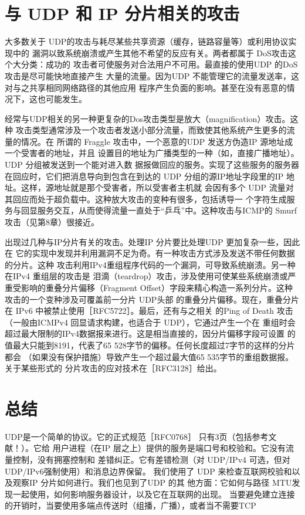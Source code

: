 \section{与 UDP 和 IP 分片相关的攻击}
大多数关于 UDP的攻击与耗尽某些共享资源（缓存，链路容量等）或利用协议实现中的
漏洞以致系统崩溃或产生其他不希望的反应有关。两者都属于 DoS攻击这个大分类：成功的
攻击者可使服务对合法用户不可用。最直接的使用UDP 的DoS攻击是尽可能快地直接产生
大量的流量。因为UDP 不能管理它的流量发送率，这对与之共享相同网络路径的其他应用
程序产生负面的影响。甚至在没有恶意的情况下，这也可能发生。

经常与UDP相关的另一种更复杂的Dos攻击类型是放大（magnification）攻击。这种
攻击类型通常涉及一个攻击者发送小部分流量，而致使其他系统产生更多的流量的情况。在
所谓的 Fraggle 攻击中，一个恶意的UDP 发送方伪造IP 源地址成一个受害者的地址，并且
设置目的地址为广播类型的一种（如，直接广播地址）。UDP 分组被发送到一个能对进入数
据报做回应的服务。实现了这些服务的服务器在回应时，它们把消息导向到包含在到达的
UDP 分组的源IP地址字段里的IP 地址。这样，源地址就是那个受害者，所以受害者主机就
会因有多个 UDP 流量对其回应而处于超负载中。这种放大攻击的变种有很多，包括诱导一
个字符生成服务与回显服务交互，从而使得流量一直处于“乒乓”中。这种攻击与ICMP的
Smurf 攻击（见第8章）很接近。

出现过几种与IP分片有关的攻击。处理IP 分片要比处理UDP 更加复杂一些，因此在
它的实现中发现并利用漏洞不足为奇。有一种攻击方式涉及发送不带任何数据的分片。这种
攻击利用IPv4重组程序代码的一个漏洞，可导致系统崩溃。另一种在IPv4 重组层的攻击是
泪滴（teardrop）攻击，涉及使用可使某些系统崩溃或严重受影响的重叠分片偏移（Fragment
Offset）字段来精心构造一系列分片。这种攻击的一个变种涉及可覆盖前一分片 UDP头部
的重叠分片偏移。现在，重叠分片在 IPv6 中被禁止使用［RFC5722］。最后，还有与之相关
的Ping of Death 攻击（一般由ICMPv4 回显请求构建，也适合于 UDP），它通过产生一个在
重组时会超过最大限制的IPv4数据报来进行。这是相当直接的，因分片偏移字段可设置
的值最大只能到8191，代表了65 528字节的偏移。任何长度超过7字节的这样的分片都会
（如果没有保护措施）导致产生一个超过最大值65 535字节的重组数据报。关于某些形式的
分片攻击的应对技术在［RFC3128］给出。

\section{总结}
UDP是一个简单的协议。它的正式规范［RFC0768］ 只有3页（包括参考文献！）。它给
用户进程（在IP 层之上）提供的服务是端口号和校验和。它没有流量控制，没有拥塞控制和
差错纠正。它有差错检测（对 UDP/IPv4 可选，但对UDP/IPv6强制使用）和消息边界保留。
我们使用了 UDP 来检查互联网校验和以及观察IP 分片如何进行。我们也见到了UDP 的其
他方面：它如何与路径 MTU发现一起使用，如何影响服务器设计，以及它在互联网的出现。
当要避免建立连接的开销时，当要使用多端点传送时（组播，广播），或者当不需要TCP

